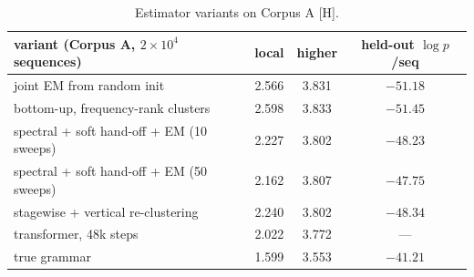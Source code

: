 \documentclass[11pt]{article}
\theoremstyle{definition}
\theoremstyle{remark}
\newcommand{\src}[1]{\textsf{\small[#1]}}
\begin{document}
\begin{table}[!htbp]\centering\small
\begin{tabular}{lccc}
\toprule
variant (Corpus A, $2\times10^4$ sequences) & local & higher & held-out $\log p$/seq\\
\midrule
joint EM from random init & 2.566 & 3.831 & $-51.18$\\
bottom-up, frequency-rank clusters & 2.598 & 3.833 & $-51.45$\\
spectral + soft hand-off + EM (10 sweeps) & 2.227 & 3.802 & $-48.23$\\
spectral + soft hand-off + EM (50 sweeps) & 2.162 & 3.807 & $-47.75$\\
stagewise + vertical re-clustering & 2.240 & 3.802 & $-48.34$\\
\midrule
transformer, 48k steps & 2.022 & 3.772 & ---\\
true grammar & 1.599 & 3.553 & $-41.21$\\
\bottomrule
\end{tabular}
\caption{Estimator variants on Corpus A \src{H}.}
\end{table}
\end{document}
